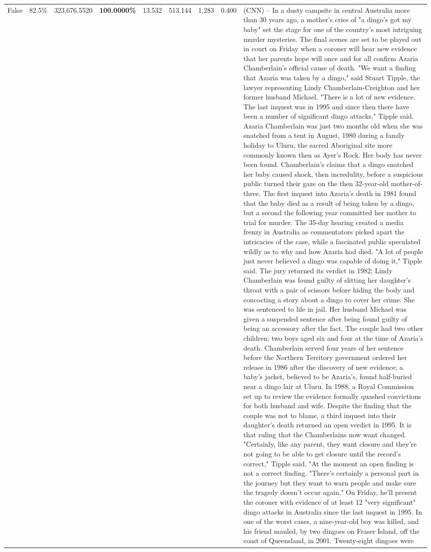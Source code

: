 \begin{table}[H]
\begin{tabular}{lllrlllll}
False & 82.5\% & 323,676.5520 & \bfseries \color{red} 100.0000\% & 13.532 & 513.144 & 1,283 & 0.400 & (CNN) -- In a dusty campsite in central Australia more than 30 years ago, a mother's cries of "a dingo's got my baby" set the stage for one of the country's most intriguing murder mysteries. The final scenes are set to be played out in court on Friday when a coroner will hear new evidence that her parents hope will once and for all confirm Azaria Chamberlain's official cause of death. "We want a finding that Azaria was taken by a dingo," said Stuart Tipple, the lawyer representing Lindy Chamberlain-Creighton and her former husband Michael. "There is a lot of new evidence. The last inquest was in 1995 and since then there have been a number of significant dingo attacks," Tipple said. Azaria Chamberlain was just two months old when she was snatched from a tent in August, 1980 during a family holiday to Uluru, the sacred Aboriginal site more commonly known then as Ayer's Rock. Her body has never been found. Chamberlain's claims that a dingo snatched her baby caused shock, then incredulity, before a suspicious public turned their gaze on the then 32-year-old mother-of-three. The first inquest into Azaria's death in 1981 found that the baby died as a result of being taken by a dingo, but a second the following year committed her mother to trial for murder. The 35-day hearing created a media frenzy in Australia as commentators picked apart the intricacies of the case, while a fascinated public speculated wildly as to why and how Azaria had died. "A lot of people just never believed a dingo was capable of doing it," Tipple said. The jury returned its verdict in 1982; Lindy Chamberlain was found guilty of slitting her daughter's throat with a pair of scissors before hiding the body and concocting a story about a dingo to cover her crime. She was sentenced to life in jail. Her husband Michael was given a suspended sentence after being found guilty of being an accessory after the fact. The couple had two other children; two boys aged six and four at the time of Azaria's death. Chamberlain served four years of her sentence before the Northern Territory government ordered her release in 1986 after the discovery of new evidence; a baby's jacket, believed to be Azaria's, found half-buried near a dingo lair at Uluru. In 1988, a Royal Commission set up to review the evidence formally quashed convictions for both husband and wife. Despite the finding that the couple was not to blame, a third inquest into their daughter's death returned an open verdict in 1995. It is that ruling that the Chamberlains now want changed. "Certainly, like any parent, they want closure and they're not going to be able to get closure until the record's correct," Tipple said. "At the moment an open finding is not a correct finding. "There's certainly a personal part in the journey but they want to warn people and make sure the tragedy doesn't occur again." On Friday, he'll present the coroner with evidence of at least 12 "very significant" dingo attacks in Australia since the last inquest in 1995. In one of the worst cases, a nine-year-old boy was killed, and his friend mauled, by two dingoes on Fraser Island, off the coast of Queensland, in 2001. Twenty-eight dingoes were 
\end{tabular}
\end{table}

